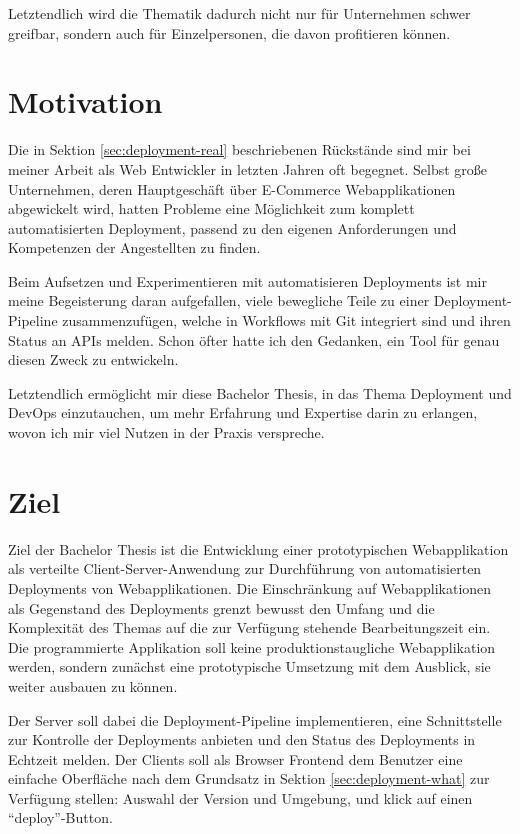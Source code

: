 \documentclass{scrartcl}
\begin{document}
Letztendlich wird die Thematik dadurch nicht nur für Unternehmen schwer greifbar, sondern auch für Einzelpersonen, die davon profitieren können.

\section{Motivation}

Die in Sektion \ref{sec:deployment-real} beschriebenen Rückstände sind mir bei meiner Arbeit als Web Entwickler in letzten Jahren oft begegnet. Selbst große Unternehmen, deren Hauptgeschäft über E-Commerce Webapplikationen abgewickelt wird, hatten Probleme eine Möglichkeit zum komplett automatisierten Deployment, passend zu den eigenen Anforderungen und Kompetenzen der Angestellten zu finden.

Beim Aufsetzen und Experimentieren mit automatisieren Deployments ist mir meine Begeisterung daran aufgefallen, viele bewegliche Teile zu einer Deployment-Pipeline zusammenzufügen, welche in Workflows mit Git integriert sind und ihren Status an APIs melden. Schon öfter hatte ich den Gedanken, ein Tool für genau diesen Zweck zu entwickeln.

Letztendlich ermöglicht mir diese Bachelor Thesis, in das Thema Deployment und Dev\-Ops einzutauchen, um mehr Erfahrung und Expertise darin zu erlangen, wovon ich mir viel Nutzen in der Praxis verspreche.

\section{Ziel}
\label{sec:ziel}

Ziel der Bachelor Thesis ist die Entwicklung einer prototypischen Webapplikation als verteilte Client-Server-Anwendung zur Durchführung von automatisierten Deployments von Webapplikationen. Die Einschränkung auf Webapplikationen als Gegenstand des Deployments grenzt bewusst den Umfang und die Komplexität des Themas auf die zur Verfügung stehende Bearbeitungszeit ein. Die programmierte Applikation soll keine produktionstaugliche Webapplikation werden, sondern zunächst eine prototypische Umsetzung mit dem Ausblick, sie weiter ausbauen zu können.

Der Server soll dabei die Deployment-Pipeline implementieren, eine Schnittstelle zur Kontrolle der Deployments anbieten und den Status des Deployments in Echtzeit melden. Der Clients soll als Browser Frontend dem Benutzer eine einfache Oberfläche nach dem Grundsatz in Sektion \ref{sec:deployment-what} zur Verfügung stellen: Auswahl der Version und Umgebung, und klick auf einen ``deploy''-Button.
\end{document}
